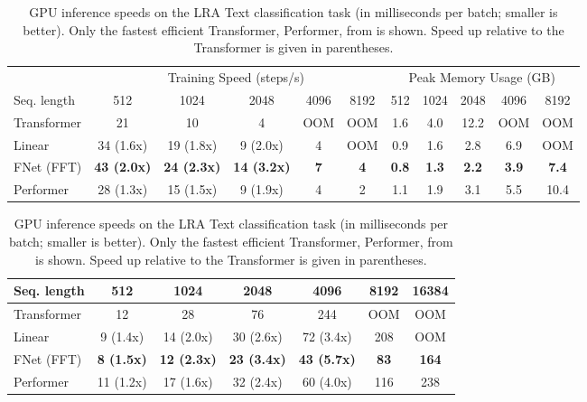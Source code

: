 \begin{table}[tb]
\begin{subtable}[t]{\textwidth}
    \label{tab:lra_accuracy}
    \end{subtable}
    \begin{subtable}[t]{\textwidth}
    \centering
    \setlength{\tabcolsep}{4pt}
    \begin{tabular}{l | c c c c c | c c c c c}
        \hline
         & \multicolumn{5}{c|}{Training Speed (steps/s)} & \multicolumn{5}{c}{Peak Memory Usage (GB)} \\ 
         Seq. length & 512 & 1024 & 2048 & 4096 & 8192 & 512 & 1024 & 2048 & 4096 & 8192  \\ \hline \hline
         Transformer & 21 & 10 & 4 & OOM & OOM  & 1.6 & 4.0 & 12.2 & OOM & OOM \\
         Linear & 34 (1.6x) & 19 (1.8x) & 9 (2.0x) & 4 & OOM & 0.9 & 1.6 & 2.8 & 6.9 & OOM  \\
         FNet (FFT) &\textbf{43 (2.0x)} & \textbf{24 (2.3x)} & \textbf{14 (3.2x)} & \textbf{7} & \textbf{4} & \textbf{0.8} & \textbf{1.3} & \textbf{2.2} & \textbf{3.9} & \textbf{7.4}  \\
         Performer & 28 (1.3x) & 15 (1.5x) & 9 (1.9x) & 4 & 2 & 1.1 & 1.9 & 3.1 & 5.5 & 10.4 \\ \hline
    \end{tabular}
    \caption{GPU training for sequence lengths up to 8192. Only the fastest efficient Transformer, namely Performer, from \citet{tay2020long} is shown. Left: training speeds (in steps per second; larger is better), with speed-up multipliers relative to the Transformer given in parentheses. Right: peak memory usage (in GB; smaller is better).}
    \label{tab:lra_training_speed}
    \end{subtable}
    \begin{subtable}[t]{\textwidth}
    \centering
    \begin{tabular}{l | c c c c c c}
        \hline
         Seq. length & 512 & 1024 & 2048 & 4096 & 8192 & 16384 \\ \hline \hline
         Transformer & 12 & 28 & 76 & 244 & OOM & OOM \\
         Linear & 9 (1.4x) & 14 (2.0x) & 30 (2.6x) & 72 (3.4x) & 208 & OOM \\
         FNet (FFT) & \textbf{8 (1.5x)} & \textbf{12 (2.3x)} & \textbf{23 (3.4x)} & \textbf{43 (5.7x)} & \textbf{83} & \textbf{164} \\
         Performer & 11 (1.2x) & 17 (1.6x) & 32 (2.4x) & 60 (4.0x) & 116 & 238 \\ \hline
    \end{tabular}
    \caption{GPU inference speeds on the LRA Text classification task (in milliseconds per batch; smaller is better). Only the fastest efficient Transformer, Performer, from \citet{tay2020long} is shown. Speed up relative to the Transformer is given in parentheses.}
    \label{tab:lra_inference_speeds}
    \end{subtable}
\end{table}

